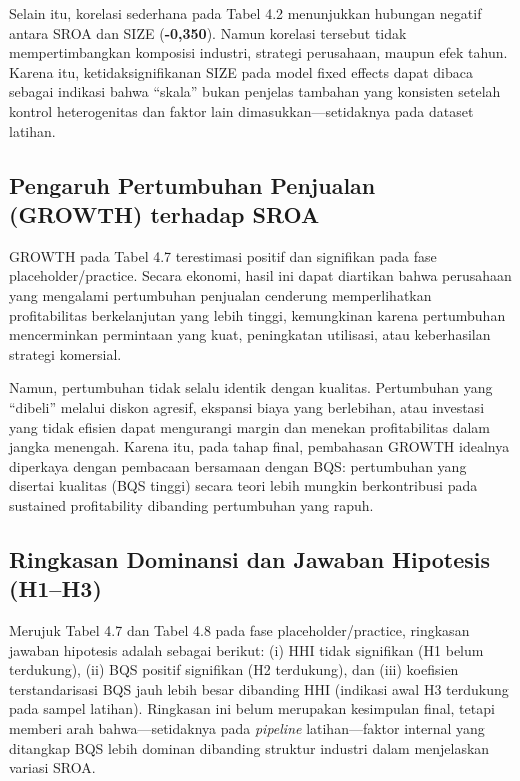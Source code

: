 \documentclass[12pt,a4paper]{report}
\begin{document}
Selain itu, korelasi sederhana pada Tabel 4.2 menunjukkan hubungan
negatif antara SROA dan SIZE (\textbf{-0,350}). Namun korelasi tersebut
tidak mempertimbangkan komposisi industri, strategi perusahaan, maupun
efek tahun. Karena itu, ketidaksignifikanan SIZE pada model fixed
effects dapat dibaca sebagai indikasi bahwa ``skala'' bukan penjelas
tambahan yang konsisten setelah kontrol heterogenitas dan faktor lain
dimasukkan---setidaknya pada dataset latihan.

\hypertarget{pengaruh-pertumbuhan-penjualan-growth-terhadap-sroa}{%
\subsection{Pengaruh Pertumbuhan Penjualan (GROWTH) terhadap
SROA}\label{pengaruh-pertumbuhan-penjualan-growth-terhadap-sroa}}

GROWTH pada Tabel 4.7 terestimasi positif dan signifikan pada fase
placeholder/practice. Secara ekonomi, hasil ini dapat diartikan bahwa
perusahaan yang mengalami pertumbuhan penjualan cenderung memperlihatkan
profitabilitas berkelanjutan yang lebih tinggi, kemungkinan karena
pertumbuhan mencerminkan permintaan yang kuat, peningkatan utilisasi,
atau keberhasilan strategi komersial.

Namun, pertumbuhan tidak selalu identik dengan kualitas. Pertumbuhan
yang ``dibeli'' melalui diskon agresif, ekspansi biaya yang berlebihan,
atau investasi yang tidak efisien dapat mengurangi margin dan menekan
profitabilitas dalam jangka menengah. Karena itu, pada tahap final,
pembahasan GROWTH idealnya diperkaya dengan pembacaan bersamaan dengan
BQS: pertumbuhan yang disertai kualitas (BQS tinggi) secara teori lebih
mungkin berkontribusi pada sustained profitability dibanding pertumbuhan
yang rapuh.

\hypertarget{ringkasan-dominansi-dan-jawaban-hipotesis-h1h3}{%
\subsection{Ringkasan Dominansi dan Jawaban Hipotesis
(H1--H3)}\label{ringkasan-dominansi-dan-jawaban-hipotesis-h1h3}}

Merujuk Tabel 4.7 dan Tabel 4.8 pada fase placeholder/practice,
ringkasan jawaban hipotesis adalah sebagai berikut: (i) HHI tidak
signifikan (H1 belum terdukung), (ii) BQS positif signifikan (H2
terdukung), dan (iii) koefisien terstandarisasi BQS jauh lebih besar
dibanding HHI (indikasi awal H3 terdukung pada sampel latihan).
Ringkasan ini belum merupakan kesimpulan final, tetapi memberi arah
bahwa---setidaknya pada \emph{pipeline} latihan---faktor internal yang
ditangkap BQS lebih dominan dibanding struktur industri dalam
menjelaskan variasi SROA.
\end{document}
